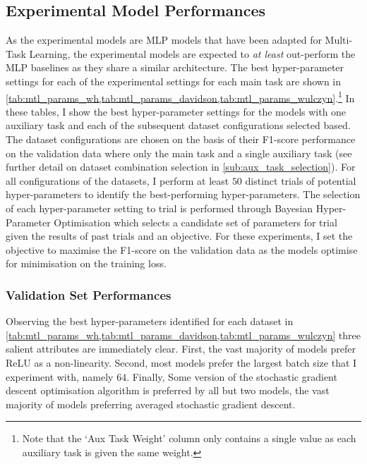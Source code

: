 \subsection{Experimental Model Performances}
As the experimental models are MLP models that have been adapted for Multi-Task Learning, the experimental models are expected to \textit{at least} out-perform the MLP baselines as they share a similar architecture.
The best hyper-parameter settings for each of the experimental settings for each main task are shown in \cref{tab:mtl_params_wh,tab:mtl_params_davidson,tab:mtl_params_wulczyn}.\footnote{Note that the `Aux Task Weight' column only contains a single value as each auxiliary task is given the same weight.}
In these tables, I show the best hyper-parameter settings for the models with one auxiliary task and each of the subsequent dataset configurations selected based.
The dataset configurations are chosen on the basis of their F1-score performance on the validation data where only the main task and a single auxiliary task (see further detail on dataset combination selection in \cref{sub:aux_task_selection}).
For all configurations of the datasets, I perform at least $50$ distinct trials of potential hyper-parameters to identify the best-performing hyper-parameters.
The selection of each hyper-parameter setting to trial is performed through Bayesian Hyper-Parameter Optimisation which selects a candidate set of parameters for trial given the results of past trials and an objective.
For these experiments, I set the objective to maximise the F1-score on the validation data as the models optimise for minimisation on the training loss.

\subsubsection{Validation Set Performances}

Observing the best hyper-parameters identified for each dataset in \cref{tab:mtl_params_wh,tab:mtl_params_davidson,tab:mtl_params_wulczyn} three salient attributes are immediately clear.
First, the vast majority of models prefer ReLU as a non-linearity.
Second, most models prefer the largest batch size that I experiment with, namely $64$.
Finally, Some version of the stochastic gradient descent optimisation algorithm is preferred by all but two models, the vast majority of models preferring averaged stochastic gradient descent.

